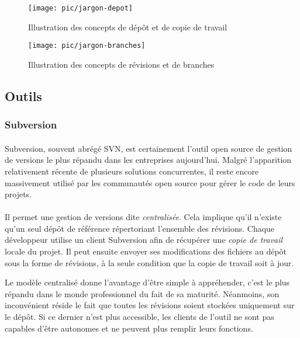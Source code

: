 \begin{figure}
	\centering
	\texttt{[image: pic/jargon-depot]}
	\caption{Illustration des concepts de dépôt et de copie de travail}
	\label{figure:pic-source:jargon-depot}
\end{figure}

\begin{figure}
	\centering
	\texttt{[image: pic/jargon-branches]}
	\caption{Illustration des concepts de révisions et de branches}
	\label{figure:pic-source:jargon-branches}
\end{figure}



\subsection{Outils}

\subsubsection{Subversion}

\paragraph{}
Subversion, souvent abrégé SVN, est certainement l'outil open source de gestion de versions le plus répandu dans les entreprises aujourd'hui.
Malgré l'apparition relativement récente de plusieurs solutions concurrentes, il reste encore massivement utilisé par les communautés open source pour gérer le code de leurs projets.


\paragraph{}
Il permet une gestion de versions dite \emph{centralisée}.
Cela implique qu'il n'existe qu'un seul dépôt de référence répertoriant l'ensemble des révisions.
Chaque développeur utilise un client Subversion afin de récupérer une \emph{copie de travail} locale du projet.
Il peut ensuite envoyer ses modifications des fichiers au dépôt sous la forme de révisions, à la seule condition que la copie de travail soit à jour.

Le modèle centralisé donne l'avantage d'être simple à appréhender, c'est le plus répandu dans le monde professionnel du fait de sa maturité.
Néanmoins, son inconvénient réside le fait que toutes les révisions soient stockées uniquement sur le dépôt.
Si ce dernier n'est plus accessible, les clients de l'outil ne sont pas capables d'être autonomes et ne peuvent plus remplir leurs fonctions.

